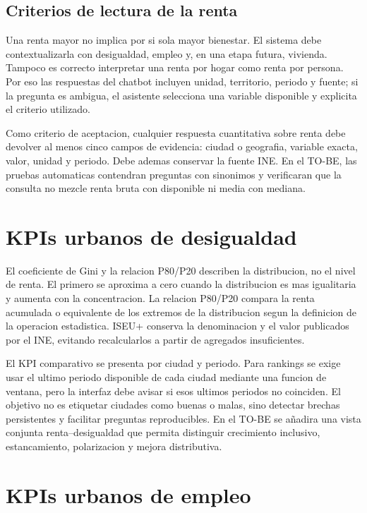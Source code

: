 \subsection{Criterios de lectura de la renta}

Una renta mayor no implica por si sola mayor bienestar. El sistema debe contextualizarla con desigualdad, empleo y, en una etapa futura, vivienda. Tampoco es correcto interpretar una renta por hogar como renta por persona. Por eso las respuestas del chatbot incluyen unidad, territorio, periodo y fuente; si la pregunta es ambigua, el asistente selecciona una variable disponible y explicita el criterio utilizado.

Como criterio de aceptacion, cualquier respuesta cuantitativa sobre renta debe devolver al menos cinco campos de evidencia: ciudad o geografia, variable exacta, valor, unidad y periodo. Debe ademas conservar la fuente INE. En el TO-BE, las pruebas automaticas contendran preguntas con sinonimos y verificaran que la consulta no mezcle renta bruta con disponible ni media con mediana.

\section{KPIs urbanos de desigualdad}

El coeficiente de Gini y la relacion P80/P20 describen la distribucion, no el nivel de renta. El primero se aproxima a cero cuando la distribucion es mas igualitaria y aumenta con la concentracion. La relacion P80/P20 compara la renta acumulada o equivalente de los extremos de la distribucion segun la definicion de la operacion estadistica. ISEU+ conserva la denominacion y el valor publicados por el INE, evitando recalcularlos a partir de agregados insuficientes.

El KPI comparativo se presenta por ciudad y periodo. Para rankings se exige usar el ultimo periodo disponible de cada ciudad mediante una funcion de ventana, pero la interfaz debe avisar si esos ultimos periodos no coinciden. El objetivo no es etiquetar ciudades como buenas o malas, sino detectar brechas persistentes y facilitar preguntas reproducibles. En el TO-BE se añadira una vista conjunta renta--desigualdad que permita distinguir crecimiento inclusivo, estancamiento, polarizacion y mejora distributiva.

\section{KPIs urbanos de empleo}

